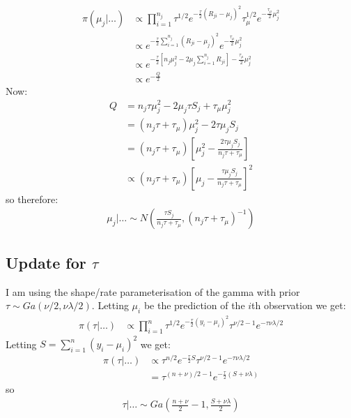 \documentclass{article}
\begin{document}
\begin{align*}
\pi(\mu_{j}|\ldots)  &\propto \prod_{i=1}^{n_j}  \tau^{1/2} e^{-\frac{\tau}{2} (R_{ji} - \mu_{j})^2} \tau_{\mu}^{1/2} e^{-\frac{\tau_\mu}{2} \mu_{j}^2 }\\
&\propto e^{-\frac{\tau}{2} \sum_{i=1}^{n_j} (R_{ji} - \mu_{j})^2} e^{-\frac{\tau_\mu}{2} \mu_{j}^2 } \\ 
&\propto e^{-\frac{\tau}{2} \left[ n_j \mu_{j}^2 - 2 \mu_j  \sum_{i=1}^{n_j} R_{ji} \right] - \frac{\tau_\mu}{2} \mu_j^2}\\
&\propto e^{-\frac{Q}{2}}
\end{align*}
Now:
\begin{align*}
Q &= n_j \tau \mu_j^2 - 2\mu_j \tau S_j + \tau_\mu \mu_j^2\\
&= (n_j \tau + \tau_\mu) \mu_j^2 - 2 \tau \mu_j S_j \\
&= (n_j \tau + \tau_\mu) \left[ \mu_j^2 - \frac{2 \tau \mu_j S_j}{n_j \tau + \tau_\mu} \right] \\
&\propto (n_j \tau + \tau_\mu) \left[ \mu_j - \frac{\tau \mu_j S_j}{n_j \tau + \tau_\mu} \right]^2
\end{align*}
so therefore:
\begin{align}
\mu_j| \ldots \sim N \left( \frac{\tau S_j}{n_j \tau + \tau_\mu} , (n_j \tau + \tau_\mu)^{-1} \right)
\end{align}

\subsection*{Update for $\tau$}

I am using the shape/rate parameterisation of the gamma with prior $\tau \sim Ga(\nu/2, \nu \lambda / 2)$. Letting $\mu_i$ be the prediction of the $i$th observation we get:
\begin{align*}
\pi(\tau | \ldots) &\propto \prod_{i=1}^n \tau^{1/2} e^{-\frac{\tau}{2} (y_i - \mu_i)^2} \tau^{\nu/2 - 1} e^{-\tau \nu \lambda / 2}
\end{align*}
Letting $S = \sum_{i=1}^n (y_i - \mu_i)^2$ we get:
\begin{align*}
\pi(\tau | \ldots) &\propto \tau^{n/2} e^{-\frac{\tau}{2} S} \tau^{\nu/2 - 1} e^{-\tau \nu \lambda / 2}\\
&= \tau^{(n + \nu)/2 - 1} e^{-\frac{\tau}{2} (S + \nu \lambda)}
\end{align*}
so
\begin{align}
\tau | \ldots \sim Ga \left( \frac{n + \nu}{2} - 1, \frac{S + \nu \lambda}{2} \right)
\end{align}
\end{document}
